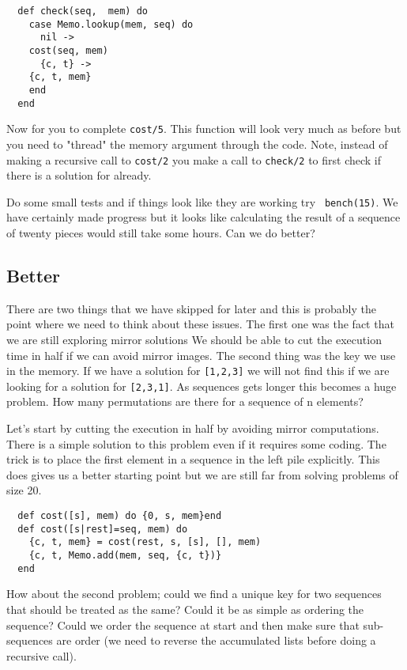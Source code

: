 \documentclass[a4paper,11pt]{article}
\begin{document}
\begin{verbatim}
  def check(seq,  mem) do
    case Memo.lookup(mem, seq) do
      nil ->
	cost(seq, mem)
      {c, t} ->
	{c, t, mem}
    end
  end
\end{verbatim}

Now for you to complete {\tt cost/5}. This function will look very
much as before but you need to "thread" the memory argument through
the code. Note, instead of making a recursive call to {\tt cost/2} you
make a call to {\tt check/2} to first check if there is a solution for
already.

Do some small tests and if things look like they are working try {\tt
  bench(15)}. We have certainly made progress but it looks like
calculating the result of a sequence of twenty pieces would still take
some hours. Can we do better?

\subsection*{Better}

There are two things that we have skipped for later and this is
probably the point where we need to think about these issues. The
first one was the fact that we are still exploring mirror solutions We
should be able to cut the execution time in half if we can avoid
mirror images. The second thing was the key we use in the memory. If
we have a solution for {\tt [1,2,3]} we will not find this if we are
looking for a solution for {\tt [2,3,1]}.  As sequences gets longer
this becomes a huge problem. How many permutations are there for a
sequence of n elements?

Let's start by cutting the execution in half by avoiding mirror
computations. There is a simple solution to this problem even if it
requires some coding. The trick is to place the first element in a
sequence in the left pile explicitly. This does gives us a better
starting point but we are still far from solving problems of size 20.

\begin{verbatim}
  def cost([s], mem) do {0, s, mem}end
  def cost([s|rest]=seq, mem) do
    {c, t, mem} = cost(rest, s, [s], [], mem)
    {c, t, Memo.add(mem, seq, {c, t})}
  end  
\end{verbatim}


How about the second problem; could we find a unique key for two
sequences that should be treated as the same? Could it be as simple as
ordering the sequence? Could we order the sequence at start and then
make sure that sub-sequences are order (we need to reverse the
accumulated lists before doing a recursive call).
\end{document}
